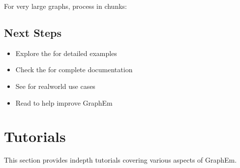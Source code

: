 \documentclass[letterpaper,10pt,english]{sphinxmanual}
\begin{document}
\sphinxAtStartPar
For very large graphs, process in chunks:

\begin{sphinxVerbatim}[commandchars=\\\{\}]
  
                  
          
           
\end{sphinxVerbatim}


\section{Next Steps}
\label{\detokenize{quickstart:next-steps}}\begin{itemize}
\item {} 
\sphinxAtStartPar
Explore the {\hyperref[\detokenize{tutorials::doc}]{}} for detailed examples

\item {} 
\sphinxAtStartPar
Check the {\hyperref[\detokenize{api_reference::doc}]{}} for complete documentation

\item {} 
\sphinxAtStartPar
See  for real\sphinxhyphen{}world use cases

\item {} 
\sphinxAtStartPar
Read {\hyperref[\detokenize{contributing::doc}]{}} to help improve GraphEm

\end{itemize}

\sphinxstepscope


\chapter{Tutorials}
\label{\detokenize{tutorials:tutorials}}\label{\detokenize{tutorials::doc}}
\sphinxAtStartPar
This section provides in\sphinxhyphen{}depth tutorials covering various aspects of GraphEm.
\end{document}
